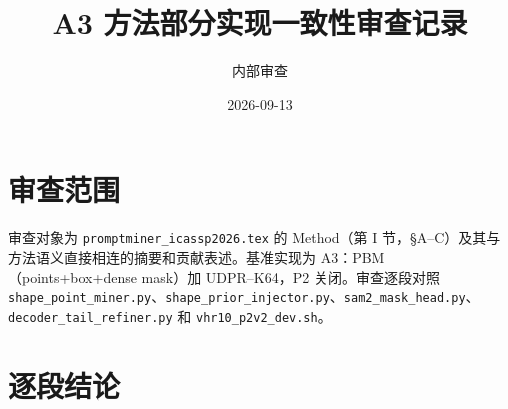 \documentclass[UTF8,11pt]{ctexart}
\title{A3 方法部分实现一致性审查记录}
\author{内部审查}
\date{2026-09-13}
\begin{document}
\maketitle

\section*{审查范围}
审查对象为 \texttt{promptminer\_icassp2026.tex} 的 Method（第 I 节，\S A--C）及其与方法语义直接相连的摘要和贡献表述。基准实现为 A3：PBM（points+box+dense mask）加 UDPR--K64，P2 关闭。审查逐段对照 \texttt{shape\_point\_miner.py}、\texttt{shape\_prior\_injector.py}、\texttt{sam2\_mask\_head.py}、\texttt{decoder\_tail\_refiner.py} 和 \texttt{vhr10\_p2v2\_dev.sh}。

\section*{逐段结论}
\end{document}
